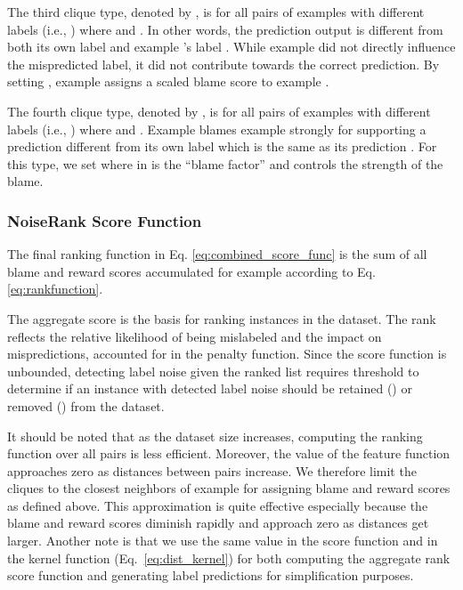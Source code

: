 The third clique type, denoted by , is for all pairs of examples  with different labels (i.e., ) where  and . In other words, the prediction output  is different from both its own label  and example 's label . While example  did not directly influence the mispredicted label, it did not contribute towards the correct prediction. By setting , example  assigns a scaled blame score to example .



The fourth clique type, denoted by , is for all pairs of examples  with different labels (i.e., ) where  and . Example  blames example  strongly for supporting a prediction different from its own label  which is the same as its prediction . For this type, we set  where  in  is the ``blame factor'' and controls the strength of the blame.










\subsubsection{NoiseRank Score Function}




The final ranking function in Eq. \ref{eq:combined_score_func} is the sum of all blame and reward scores accumulated for example  according to Eq. \ref{eq:rankfunction}. 



The aggregate score  is the basis for ranking instances in the dataset. The rank reflects the relative likelihood of being mislabeled and the impact on mispredictions, accounted for in the penalty function. Since the score function is unbounded, detecting label noise given the ranked list requires threshold  to determine if an instance with detected label noise should be retained () or removed () from the dataset.










It should be noted that as the dataset size increases, computing the ranking function over all  pairs is less efficient. Moreover, the value of the feature function  approaches zero as distances between pairs increase. We therefore limit the cliques to the  closest neighbors of example  for assigning blame and reward scores as defined above. This approximation is quite effective especially because the blame and reward scores diminish rapidly and approach zero as distances get larger. 
Another note is that we use the same  value in the score function and in the kernel function (Eq.~\ref{eq:dist_kernel}) for both computing the aggregate rank score function and generating label predictions  for simplification purposes. 












